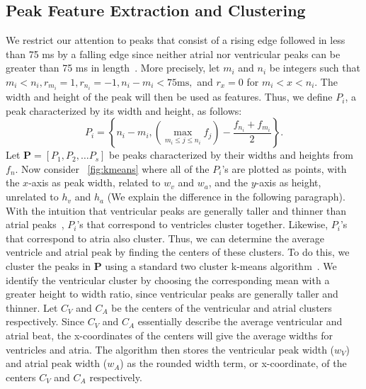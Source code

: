 \documentclass[conference]{IEEEtran}
\newcommand{\APW}{\ensuremath{w_A}}
\newcommand{\VPW}{\ensuremath{w_V}}
\begin{document}
\subsection{Peak Feature Extraction and Clustering}
We restrict our attention to peaks that consist of a rising edge
followed in less than 75 ms by a falling edge since 
neither atrial nor ventricular peaks can be greater than 75 ms in length~\cite{cardiac-cycle}.
More precisely, let $m_i$ and $n_i$ be integers such that $m_i < n_i, r_{m_i}=1, r_{n_i} = -1, n_i-m_i < 75 \text{ms},$ and $r_x=0 $ for $m_i < x < n_i$.
The width and height of the peak will then be used as features.  Thus, we define $P_i$, a peak characterized by its width and height, as follows:
\begin{equation*}
	P_i = \left\{n_i-m_i, \left( \max\limits_{m_i\le j\le n_i} f_j \right) - \frac{f_{n_i}+f_{m_i}}{2} \right\}.
\end{equation*}
Let $\mathbf{P} = [P_1, P_2, \dots P_s]$ be peaks characterized by their widths and heights from $f_n$.
Now consider \figurename~\ref{fig:kmeans} where all of the $P_i$'s are plotted as points, with the $x$-axis as peak width, related to $w_v$ and $w_a$, and the $y$-axis as height, unrelated to 
$h_v$ and $h_a$ (We explain the difference in the following paragraph).
With the intuition that ventricular peaks are generally taller and thinner than atrial peaks~\cite{cardiac-cycle},
$P_i$'s that correspond to ventricles cluster together.  Likewise, $P_i$'s that correspond to atria also cluster.
Thus, we can determine the average ventricle and atrial peak by finding the centers of these clusters.  To do this,
we cluster the peaks in $\mathbf{P}$ using a standard two cluster k-means algorithm~\cite{k-means}.  
We identify the ventricular cluster by choosing the corresponding mean 
with a greater height to width ratio, since
ventricular peaks are generally taller and thinner. Let $C_V$ and $C_A$
be the centers of the ventricular and atrial clusters 
respectively. Since $C_V$ and $C_A$ essentially describe the average ventricular and atrial beat, the x-coordinates of the centers will give the average widths for ventricles and atria. The algorithm then stores the ventricular
peak width (\VPW) and atrial peak width (\APW) as the
rounded width term, or x-coordinate, of the centers $C_V$ and $C_A$ respectively.
\end{document}
